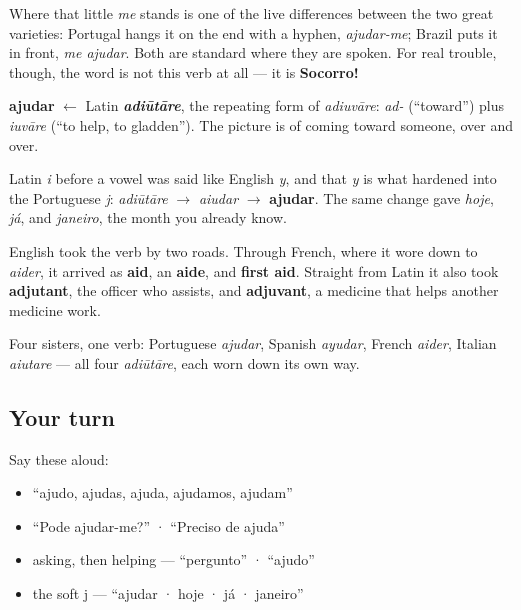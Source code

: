 Where that little \emph{me} stands is one of the live differences between the two great varieties: Portugal hangs it on the end with a hyphen, \emph{ajudar-me}; Brazil puts it in front, \emph{me ajudar}. Both are standard where they are spoken. For real trouble, though, the word is not this verb at all — it is \textbf{Socorro!}

\begin{cousinweb}
\textbf{ajudar} $\leftarrow$ Latin \emph{\textbf{adiūtāre}}, the repeating form of \emph{adiuvāre}: \emph{ad-} (\textquotedblleft{}toward\textquotedblright{}) plus \emph{iuvāre} (\textquotedblleft{}to help, to gladden\textquotedblright{}). The picture is of coming toward someone, over and over.

Latin \emph{i} before a vowel was said like English \emph{y}, and that \emph{y} is what hardened into the Portuguese \emph{j}: \emph{adiūtāre} $\to$ \emph{aiudar} $\to$ \textbf{ajudar}. The same change gave \emph{hoje}, \emph{já}, and \emph{janeiro}, the month you already know.

English took the verb by two roads. Through French, where it wore down to \emph{aider}, it arrived as \textbf{aid}, an \textbf{aide}, and \textbf{first aid}. Straight from Latin it also took \textbf{adjutant}, the officer who assists, and \textbf{adjuvant}, a medicine that helps another medicine work.

Four sisters, one verb: Portuguese \emph{ajudar}, Spanish \emph{ayudar}, French \emph{aider}, Italian \emph{aiutare} — all four \emph{adiūtāre}, each worn down its own way.
\end{cousinweb}

\subsection*{Your turn}
Say these aloud:

\begin{itemize}
\raggedright
  \item \textquotedblleft{}ajudo, ajudas, ajuda, ajudamos, ajudam\textquotedblright{}
  \item \textquotedblleft{}Pode ajudar-me?\textquotedblright{} · \textquotedblleft{}Preciso de ajuda\textquotedblright{}
  \item asking, then helping — \textquotedblleft{}pergunto\textquotedblright{} · \textquotedblleft{}ajudo\textquotedblright{}
  \item the soft j — \textquotedblleft{}ajudar · hoje · já · janeiro\textquotedblright{}
\end{itemize}

